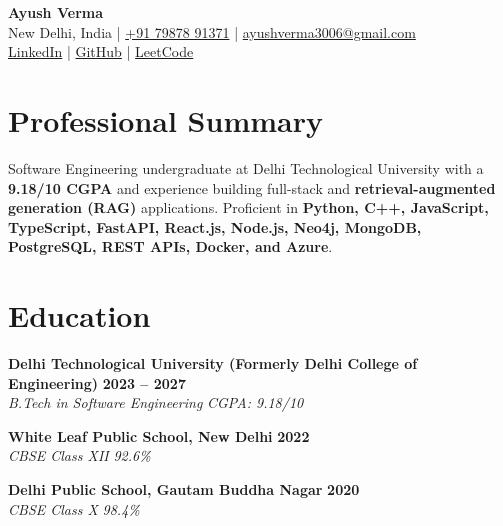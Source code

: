 \documentclass[a4paper,10pt]{article}
\newcommand{\resumeHeading}[4]{
  \textbf{#1} \hfill \textbf{#2}\\
  \textit{#3} \hfill \textit{#4}\\[-3pt]
}
\begin{document}

\begin{center}
  {\LARGE \textbf{Ayush Verma}}\\[4pt]

  New Delhi, India
  \;|\;
  \href{tel:+917987891371}{+91 79878 91371}
  \;|\;
  \href{mailto:ayushverma3006@gmail.com}
  {ayushverma3006@gmail.com}\\[2pt]

  \href{https://www.linkedin.com/in/ayush-verma-7334a8194/}
  {LinkedIn}
  \;|\;
  \href{https://github.com/ayushsotechy}
  {GitHub}
  \;|\;
  \href{https://leetcode.com/u/ayushsotechy/}
  {LeetCode}
\end{center}

\vspace{-6pt}


\section{Professional Summary}

Software Engineering undergraduate at Delhi Technological University with a
\textbf{9.18/10 CGPA} and experience building full-stack and
\textbf{retrieval-augmented generation (RAG)} applications. Proficient in
\textbf{Python, C++, JavaScript, TypeScript, FastAPI, React.js, Node.js,
Neo4j, MongoDB, PostgreSQL, REST APIs, Docker, and Azure}.


\section{Education}

\resumeHeading
  {Delhi Technological University (Formerly Delhi College of Engineering)}
  {2023 -- 2027}
  {B.Tech in Software Engineering}
  {CGPA: 9.18/10}

\vspace{2pt}

\resumeHeading
  {White Leaf Public School, New Delhi}
  {2022}
  {CBSE Class XII}
  {92.6\%}

\vspace{2pt}

\resumeHeading
  {Delhi Public School, Gautam Buddha Nagar}
  {2020}
  {CBSE Class X}
  {98.4\%}

\end{document}

